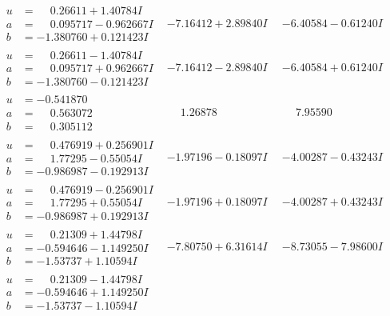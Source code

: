 \documentclass[1p]{elsarticle_modified}
\theoremstyle{definition}
\begin{document}
$$\begin{array}{c|c|c}
\begin{aligned}
u &= \phantom{-}0.26611 + 1.40784 I \\
a &= \phantom{-}0.095717 - 0.962667 I \\
b &= -1.380760 + 0.121423 I\end{aligned}
 & -7.16412 + 2.89840 I & -6.40584 - 0.61240 I \\ \hline\begin{aligned}
u &= \phantom{-}0.26611 - 1.40784 I \\
a &= \phantom{-}0.095717 + 0.962667 I \\
b &= -1.380760 - 0.121423 I\end{aligned}
 & -7.16412 - 2.89840 I & -6.40584 + 0.61240 I \\ \hline\begin{aligned}
u &= -0.541870\phantom{ +0.000000I} \\
a &= \phantom{-}0.563072\phantom{ +0.000000I} \\
b &= \phantom{-}0.305112\phantom{ +0.000000I}\end{aligned}
 & \phantom{-}1.26878\phantom{ +0.000000I} & \phantom{-}7.95590\phantom{ +0.000000I} \\ \hline\begin{aligned}
u &= \phantom{-}0.476919 + 0.256901 I \\
a &= \phantom{-}1.77295 - 0.55054 I \\
b &= -0.986987 - 0.192913 I\end{aligned}
 & -1.97196 - 0.18097 I & -4.00287 - 0.43243 I \\ \hline\begin{aligned}
u &= \phantom{-}0.476919 - 0.256901 I \\
a &= \phantom{-}1.77295 + 0.55054 I \\
b &= -0.986987 + 0.192913 I\end{aligned}
 & -1.97196 + 0.18097 I & -4.00287 + 0.43243 I \\ \hline\begin{aligned}
u &= \phantom{-}0.21309 + 1.44798 I \\
a &= -0.594646 - 1.149250 I \\
b &= -1.53737 + 1.10594 I\end{aligned}
 & -7.80750 + 6.31614 I & -8.73055 - 7.98600 I \\ \hline\begin{aligned}
u &= \phantom{-}0.21309 - 1.44798 I \\
a &= -0.594646 + 1.149250 I \\
b &= -1.53737 - 1.10594 I\end{aligned}

\end{array}$$
\end{document}
